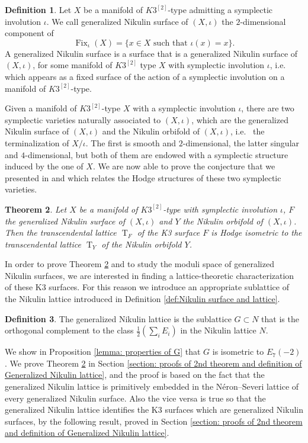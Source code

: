 \documentclass{amsart}
\newtheorem{thm}{Theorem}[section]
\theoremstyle{definition}
\newtheorem{defi}[thm]{Definition}
\numberwithin{equation}{section}
\numberwithin{equation}{section} \theoremstyle{definition}
\DeclareMathOperator{\T}{T}
\DeclareMathOperator{\Fix}{Fix}
\begin{document}
\begin{defi}
Let $X$ be a  manifold of  $K3^{[2]}$-type admitting a symplectic involution $\iota$. We call generalized Nikulin surface of $(X,\iota)$ the $2$-dimensional component of $$\Fix_{\iota}(X)=\{x\in X\mbox{ such that }\iota(x)=x\}.$$ A generalized Nikulin surface is a surface that is a generalized Nikulin surface of $(X,\iota)$, for some  manifold  of  $K3^{[2]}$  type $X$ with symplectic involution $\iota$, i.e.~ which appears as a fixed surface of the action of a symplectic involution on a  manifold  of  $K3^{[2]}$-type.
\end{defi}


Given a manifold of $K3^{[2]}$-type $X$ with a symplectic involution $\iota$, there are two symplectic varieties naturally associated to $(X,\iota)$, which are the generalized Nikulin surface of $(X,\iota)$ and the Nikulin orbifold of $(X,\iota)$, i.e.~ the terminalization of $X/\iota$. The first is smooth and $2$-dimensional, the latter singular and $4$-dimensional, but both of them are endowed with a symplectic structure induced by the one of $X$.
We are now able to prove the conjecture that we presented in \cite[Conjecture 3.12]{CGKK} and which relates the Hodge structures of these two symplectic varieties. 
\begin{thm}\label{Thm1.2} Let $X$ be a  manifold of $K3^{[2]}$-type with symplectic involution $\iota$, $F$ the generalized Nikulin surface of $(X,\iota)$ and $Y$ the Nikulin orbifold of $(X,\iota)$. Then the transcendental lattice $\T_F$ of the K3 surface $F$ is Hodge isometric to the transcendental lattice $\T_Y$ of the Nikulin orbifold $Y$.
\end{thm}


In order to prove Theorem \ref{Thm1.2} and to study the moduli space of generalized Nikulin surfaces,  we are interested in finding a lattice-theoretic characterization of these K3 surfaces. For this reason we introduce an appropriate sublattice of the Nikulin lattice introduced in Definition \ref{def:Nikulin surface and lattice}.

\begin{defi}\label{defi: generalizad Nikulin orbifold}
The generalized 
Nikulin lattice is the sublattice $G\subset N$ that is the orthogonal complement to the class $\frac{1}{2}(\sum_i E_i)$ in the Nikulin lattice $N$.\end{defi}

We show in Proposition \ref{lemma: properties of G} that $G$ is isometric to $E_7(-2)$.
We  prove Theorem \ref{Thm1.2} in Section \ref{section: proofs of 2nd theorem and definition of Generalized Nikulin lattice}, and the proof is  based on the fact that the generalized Nikulin lattice is primitively embedded in the N\'eron--Severi lattice of every generalized Nikulin surface. Also the vice versa is true so that the generalized Nikulin lattice identifies the K3 surfaces which are generalized Nikulin surfaces, by the following result, proved in Section \ref{section: proofs of 2nd theorem and definition of Generalized Nikulin lattice}.
\end{document}

